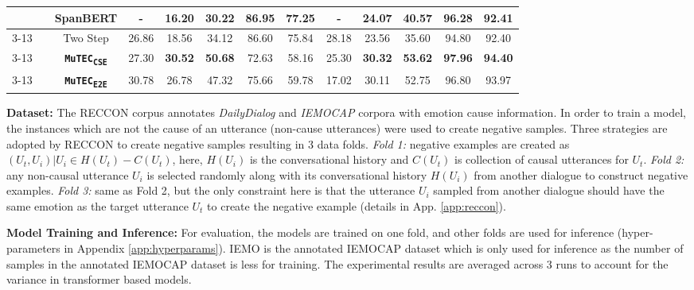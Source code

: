 \documentclass{article}
\newcommand{\subone}{\textbf{\texttt{MuTEC\textsubscript{CSE}}}}
\newcommand{\overall}{\textbf{\texttt{MuTEC\textsubscript{E2E}}}}
\begin{document}
\begin{table*}[t]
{\begin{tabular}{|c|c|c|c|c|c|c|c|c|c|c|c|c|}
&  & SpanBERT & 
- & 16.20 & 30.22 & 86.95 & 77.25 & - & 24.07 & 40.57 & 96.28 & 92.41 \\ \cline{3-13} 
&  & Two Step  &
26.86 & 18.56 & 34.12  & 86.60 &  75.84 & 28.18 & 23.56  & 35.60  &  94.80 & 92.40      \\
\cline{3-13} 
&  & \subone  &
27.30 & \textbf{30.52} & \textbf{50.68}  & 72.63 &  58.16 & 25.30 & \textbf{30.32} & \textbf{53.62}  & \textbf{97.96}  & \textbf{94.40}   
\\ 
\cline{3-13} 
& & \overall &      
30.78 & 26.78 & 47.32 & 75.66 & 59.78 & 17.02 & 30.11 & 52.75 & 96.80 & 93.97 
\\ \hline
\end{tabular}
}
\caption{Results for Cause Span Extraction task for Two Step, \subone and \overall on RECCON-DD and RECCON-IEMO. IEMO dataset is only used in the inference phase.}
\label{tab:task1_twostep}
\vspace{-3mm}
\end{table*}






\noindent\textbf{Dataset:}
The RECCON corpus annotates \textit{DailyDialog} \cite{li-etal-2017-dailydialog} and \textit{IEMOCAP} \cite{busso2008iemocap} corpora with emotion cause information. In order to train a model, the instances which are not the cause of an utterance (non-cause utterances) were used to create negative samples. Three strategies are adopted by RECCON to create negative samples resulting in 3 data folds. \textit{Fold 1:} negative examples are created as ${(U_t,U_i) | U_i\in H(U_t)-C(U_t)}$, here, $H(U_i)$ is the conversational history and $C(U_t)$ is collection of causal utterances for $U_t$. \textit{Fold 2:} any non-causal utterance $U_i$ is selected randomly along with its conversational history $H(U_i)$ from another dialogue to construct negative examples. \textit{Fold 3:} same as Fold 2, but the only constraint here is that the utterance $U_i$ sampled from another dialogue should have the same emotion as the target utterance $U_t$ to create the negative example (details in App. \ref{app:reccon}).

\noindent\textbf{Model Training and Inference:}
For evaluation, the models are trained on one fold, and other folds are used for inference (hyper-parameters in Appendix \ref{app:hyperparams}). IEMO is the annotated IEMOCAP dataset which is only used for inference as the number of samples in the annotated IEMOCAP dataset is less for training. The experimental results are averaged across 3 runs to account for  the variance in transformer based models. 
\end{document}
